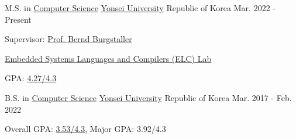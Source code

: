

\begin{cventries}

  \cventry
    {M.S. in \href{https://cs.yonsei.ac.kr/index.php}{Computer Science}} %
    {\href{https://www.yonsei.ac.kr/sc/index.jsp}{Yonsei University}} %
    {Republic of Korea} %
    {Mar. 2022 - Present} %
    {
      \begin{cvitems} %
        \item {Supervisor: \href{https://cs.yonsei.ac.kr/bbs/board.php?bo_table=sub2_1_a&wr_id=18}{Prof. Bernd Burgstaller}}
        \item {\href{https://elc.yonsei.ac.kr}{Embedded Systems Languages and Compilers (ELC) Lab}}
        \item {GPA: \href{https://drive.google.com/file/d/1p5EAixYWCerQ1rd1fb-1V0mppF3Dal0N/view?usp=sharing}{4.27/4.3}}
      \end{cvitems}
    }

  \cventry
    {B.S. in \href{https://cs.yonsei.ac.kr/index.php}{Computer Science}} %
    {\href{https://www.yonsei.ac.kr/sc/index.jsp}{Yonsei University}} %
    {Republic of Korea} %
    {Mar. 2017 - Feb. 2022} %
    {
      \begin{cvitems} %
        \item {Overall GPA: \href{https://drive.google.com/file/d/1g-O5m43w4wgwSG9iAbFg4uPoqe1EhkWh/view?usp=sharing}{3.53/4.3}, Major GPA: 3.92/4.3}
      \end{cvitems}
    }
\end{cventries}
